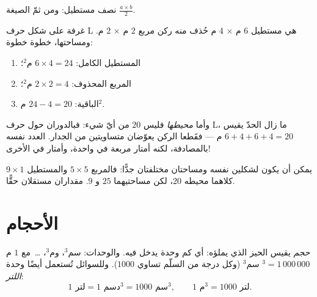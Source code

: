 \begin{omfigure}

{\small {} نصف مستطيل: ومن ثمّ الصيغة
$\frac{a\times b}{2}$.}
\end{omfigure}

\begin{example}\label{ex:g6:measure:composite}
غرفة على شكل حرف L هي مستطيل $6$ م $\times$ $4$ م حُذف منه ركن مربع $2$ م
$\times$ $2$ م. ومساحتها، خطوة خطوة:
\begin{enumerate}
  \item المستطيل الكامل: $6 \times 4 = 24$ م$^2$؛
  \item المربع المحذوف: $2 \times 2 = 4$ م$^2$؛
  \item {} الباقية: $24 - 4 = 20$ م$^2$.
\end{enumerate}
وأما \emph{محيطها} فليس $20$ من أيّ شيء: فبالدوران حول حرف L،
ما زال الحدّ يقيس $6 + 4 + 6 + 4 = 20$ م --- فقَطعا الركن
يعوّضان  متساويتين من الجدار. العدد نفسه بالمصادفة،
لكنه أمتار مربعة في واحدة، وأمتار في الأخرى!
\end{example}

\begin{remark}
يمكن أن يكون لشكلين  نفسه ومساحتان مختلفتان جدًّا:
فالمربع $5 \times 5$ والمستطيل $9 \times 1$ كلاهما محيطه
$20$، لكن مساحتيهما $25$ و $9$.   مقداران مستقلان
حقًّا.
\end{remark}

\section{الأحجام}

\begin{definition}[الحجم]\label{def:g6:measure:volume}
\emph{حجم}  يقيس الحيز الذي يملؤه:
أي كم  وحدة يدخل فيه. والوحدات: سم$^3$، وم$^3$، \dots\ مع
$1$ م$^3 = 1\,000\,000$ سم$^3$ (وكل درجة من السلّم تساوي
$1000$). وللسوائل تُستعمل أيضًا وحدة \emph{اللتر}:
\[
1 \text{ لتر} = 1 \text{ دسم}^3 = 1000 \text{ سم}^3,
\qquad
1 \text{ م}^3 = 1000 \text{ لتر}.
\]
\end{definition}

